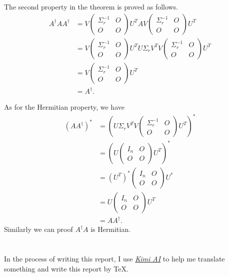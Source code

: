 \documentclass[a4paper]{article}
\begin{document}
The second property in the theorem is proved as follows.
\begin{equation}
    \begin{aligned}
        A^{\dagger} A A^{\dagger} &= V \begin{pmatrix} \Sigma_r^{-1} & O \\ O & O \end{pmatrix} U^T A V \begin{pmatrix} \Sigma_r^{-1} & O \\ O & O \end{pmatrix} U^T \\
        &= V \begin{pmatrix} \Sigma_r^{-1} & O \\ O & O \end{pmatrix} U^T U \Sigma_r V^T V \begin{pmatrix} \Sigma_r^{-1} & O \\ O & O \end{pmatrix} U^T \\
        &= V \begin{pmatrix} \Sigma_r^{-1} & O \\ O & O \end{pmatrix} U^T  \\
        &= A^{\dagger}.
    \end{aligned}
    \label{eq:5_property2}
\end{equation}

As for the Hermitian property, we have
\begin{equation}
    \begin{aligned}
        (AA^{\dagger})^* &= (U \Sigma_r V^T V \begin{pmatrix} \Sigma_r^{-1} & O \\ O & O \end{pmatrix} U^T)^* \\
        &= (U \begin{pmatrix} I_n & O \\ O & O \end{pmatrix} U^T)^* \\
        &= (U^T)^* \begin{pmatrix} I_n & O \\ O & O \end{pmatrix} U^* \\
        &= U \begin{pmatrix} I_n & O \\ O & O \end{pmatrix} U^T \\
        &= AA^{\dagger}.
    \end{aligned}
    \label{eq:5_hermitian}
\end{equation}
Similarly we can proof $A^{\dagger}A$ is Hermitian.

\section*{  }

In the process of writing this report, I use \href{https://kimi.moonshot.cn/}{\textit{Kimi AI}} to help me translate something and write this report by \TeX.
\end{document}
